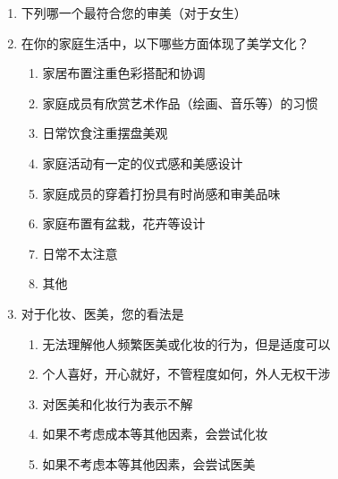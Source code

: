 \begin{enumerate}[label=第\arabic{*}题、, leftmargin=7em]
    \item 下列哪一个最符合您的审美（对于女生）
    \setcounter{subfigure}{0}
    \begin{figure}[H]
        \centering
    \end{figure}



    \item 在你的家庭生活中，以下哪些方面体现了美学文化？
    \begin{enumerate}[label=\Alph*.]
        \item 家居布置注重色彩搭配和协调
        \item 家庭成员有欣赏艺术作品（绘画、音乐等）的习惯
        \item 日常饮食注重摆盘美观
        \item 家庭活动有一定的仪式感和美感设计
        \item 家庭成员的穿着打扮具有时尚感和审美品味
        \item 家庭布置有盆栽，花卉等设计
        \item 日常不太注意
        \item 其他
    \end{enumerate}

    \item 对于化妆、医美，您的看法是
    \begin{enumerate}[label=\Alph*.]
        \item 无法理解他人频繁医美或化妆的行为，但是适度可以
        \item 个人喜好，开心就好，不管程度如何，外人无权干涉
        \item 对医美和化妆行为表示不解
        \item 如果不考虑成本等其他因素，会尝试化妆
        \item 如果不考虑本等其他因素，会尝试医美
    \end{enumerate}


\end{enumerate}
